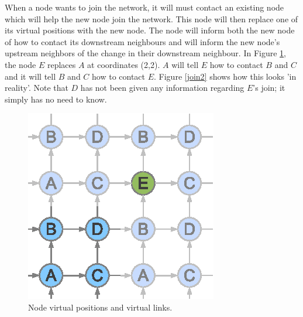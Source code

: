 \documentclass[ %
                    author={Luke Murray},
                supervisor={Dr. Simon Hollis},
                     title={Shadow Peer-to-Peer Networks},
                  subtitle={},
                    degree={MEng},
                      year={2013} ]{thesis}
\begin{document}
When a node wants to join the network, it will must contact an existing node which will help the new node join the network. This node will then replace one of its virtual positions with the new node. The node will inform both the new node of how to contact its downstream neighbours and will inform the new node's upstream neighbors of the change in their downstream neighbour. In Figure \ref{join1}, the node $E$ replaces $A$ at coordinates (2,2). $A$ will tell $E$ how to contact $B$ and $C$ and it will tell $B$ and $C$ how to contact $E$. Figure \ref{join2} shows how this looks 'in reality'. Note that $D$ has not been given any information regarding $E$'s join; it simply has no need to know.

\begin{figure}[h]%
    \centering
    \begin{minipage}[b]{0.35\linewidth}
        \centering
        \includegraphics[width=\linewidth]{diagrams/network_join1.eps}
        \caption{Node virtual positions and virtual links.}
        \label{join1}
    \end{minipage}
    \hspace{0.5cm}
    \begin{minipage}[b]{0.35\linewidth}
        \centering

\end{minipage}
\end{figure}
\end{document}
